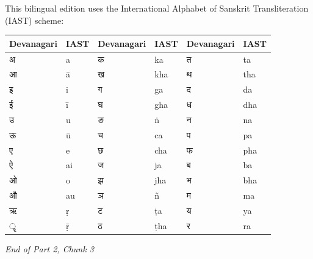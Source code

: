 \documentclass[11pt,a4paper]{article}
\begin{document}
This bilingual edition uses the International Alphabet of Sanskrit Transliteration (IAST) scheme:

\begin{center}
\begin{tabular}{llllll}
\toprule
\textbf{Devanagari} & \textbf{IAST} & \textbf{Devanagari} & \textbf{IAST} & \textbf{Devanagari} & \textbf{IAST} \\
\midrule
अ & a & क & ka & त & ta \\
आ & ā & ख & kha & थ & tha \\
इ & i & ग & ga & द & da \\
ई & ī & घ & gha & ध & dha \\
उ & u & ङ & ṅ & न & na \\
ऊ & ū & च & ca & प & pa \\
ए & e & छ & cha & फ & pha \\
ऐ & ai & ज & ja & ब & ba \\
ओ & o & झ & jha & भ & bha \\
औ & au & ञ & ñ & म & ma \\
ऋ & ṛ & ट & ṭa & य & ya \\
ॄ & ṝ & ठ & ṭha & र & ra \\
\bottomrule
\end{tabular}
\end{center}

\vspace{1cm}
\begin{center}
\textit{End of Part 2, Chunk 3}
\end{center}
\end{document}
